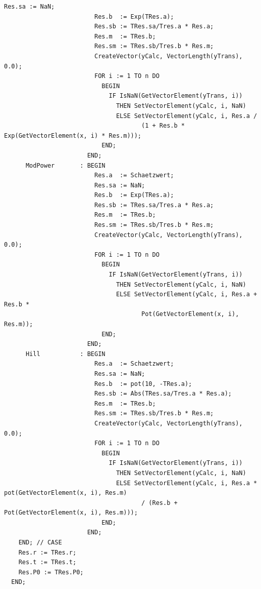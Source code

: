 \begin{refsection}
\begin{lstlisting}[caption=Linearisation of curved data]
                         Res.sa := NaN;
                         Res.b  := Exp(TRes.a);
                         Res.sb := TRes.sa/Tres.a * Res.a;
                         Res.m  := TRes.b;
                         Res.sm := TRes.sb/Tres.b * Res.m;
                         CreateVector(yCalc, VectorLength(yTrans), 0.0);
                         FOR i := 1 TO n DO
                           BEGIN
                             IF IsNaN(GetVectorElement(yTrans, i))
                               THEN SetVectorElement(yCalc, i, NaN)
                               ELSE SetVectorElement(yCalc, i, Res.a /
                                      (1 + Res.b * Exp(GetVectorElement(x, i) * Res.m)));
                           END;
                       END;
      ModPower       : BEGIN
                         Res.a  := Schaetzwert;
                         Res.sa := NaN;
                         Res.b  := Exp(TRes.a);
                         Res.sb := TRes.sa/Tres.a * Res.a;
                         Res.m  := TRes.b;
                         Res.sm := TRes.sb/Tres.b * Res.m;
                         CreateVector(yCalc, VectorLength(yTrans), 0.0);
                         FOR i := 1 TO n DO
                           BEGIN
                             IF IsNaN(GetVectorElement(yTrans, i))
                               THEN SetVectorElement(yCalc, i, NaN)
                               ELSE SetVectorElement(yCalc, i, Res.a + Res.b *
                                      Pot(GetVectorElement(x, i), Res.m));
                           END;
                       END;
      Hill           : BEGIN
                         Res.a  := Schaetzwert;
                         Res.sa := NaN;
                         Res.b  := pot(10, -TRes.a);
                         Res.sb := Abs(TRes.sa/Tres.a * Res.a);
                         Res.m  := TRes.b;
                         Res.sm := TRes.sb/Tres.b * Res.m;
                         CreateVector(yCalc, VectorLength(yTrans), 0.0);
                         FOR i := 1 TO n DO
                           BEGIN
                             IF IsNaN(GetVectorElement(yTrans, i))
                               THEN SetVectorElement(yCalc, i, NaN)
                               ELSE SetVectorElement(yCalc, i, Res.a * pot(GetVectorElement(x, i), Res.m)
                                      / (Res.b + Pot(GetVectorElement(x, i), Res.m)));
                           END;
                       END;
    END; // CASE
    Res.r := TRes.r;
    Res.t := TRes.t;
    Res.P0 := TRes.P0;
  END;
\end{lstlisting}



\end{refsection}
